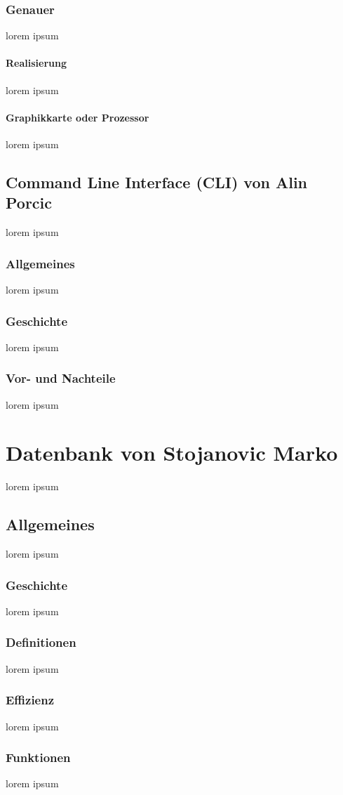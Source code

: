\documentclass[10pt,a4paper]{report}
\begin{document}
\subsubsection{Genauer}
lorem ipsum
\paragraph{Realisierung}
lorem ipsum
\paragraph{Graphikkarte oder Prozessor}
lorem ipsum
\subsection{Command Line Interface (CLI) von Alin Porcic}
lorem ipsum
\subsubsection{Allgemeines}
lorem ipsum
\subsubsection{Geschichte}
lorem ipsum
\subsubsection{Vor- und Nachteile}
lorem ipsum
\section{Datenbank von Stojanovic Marko}
lorem ipsum
\subsection{Allgemeines}
lorem ipsum
\subsubsection{Geschichte}
lorem ipsum
\subsubsection{Definitionen}
lorem ipsum
\subsubsection{Effizienz}
lorem ipsum
\subsubsection{Funktionen}
lorem ipsum
\end{document}
